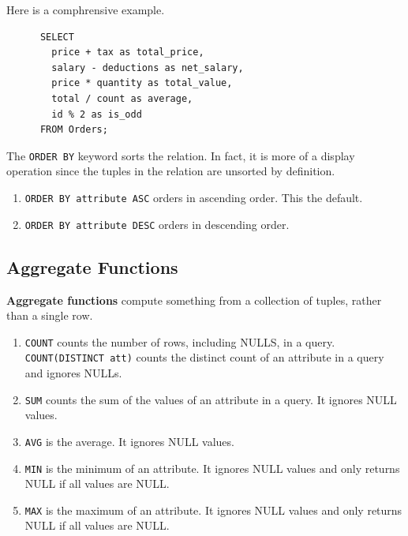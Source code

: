   \begin{example}[Arithmetic]
    \label{ex:arithmetic}
    Here is a comphrensive example. 
    \begin{lstlisting}
      SELECT 
        price + tax as total_price,
        salary - deductions as net_salary,
        price * quantity as total_value,
        total / count as average,
        id % 2 as is_odd
      FROM Orders; 
    \end{lstlisting}
  \end{example}

  \begin{definition}[Sorting]
    \label{def:sorting}
    The \texttt{ORDER BY} keyword sorts the relation. In fact, it is more of a display operation since the tuples in the relation are unsorted by definition. 
    \begin{enumerate}
      \item \texttt{ORDER BY attribute ASC} orders in ascending order. This the default. 
      \item \texttt{ORDER BY attribute DESC} orders in descending order.
    \end{enumerate}
  \end{definition}

\subsection{Aggregate Functions} 

    \begin{definition}
      \label{def:standard-sql-aggregate-functions}
 
      \textbf{Aggregate functions} compute something from a collection of tuples, rather than a single row. 
      \begin{enumerate}
        \item \texttt{COUNT} counts the number of rows, including NULLS, in a query. \texttt{COUNT(DISTINCT att)} counts the distinct count of an attribute in a query and ignores NULLs. 
        \item \texttt{SUM} counts the sum of the values of an attribute in a query. It ignores NULL values. 
        \item \texttt{AVG} is the average. It ignores NULL values. 
        \item \texttt{MIN} is the minimum of an attribute. It ignores NULL values and only returns NULL if all values are NULL. 
        \item \texttt{MAX} is the maximum of an attribute. It ignores NULL values and only returns NULL if all values are NULL. 
      \end{enumerate}
    \end{definition}

